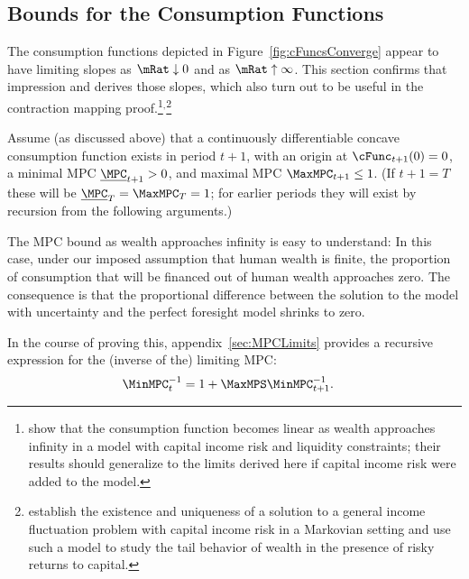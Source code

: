 \documentclass[BufferStockTheory]{subfiles}
\begin{document}
\hypertarget{Bounds-for-the-Consumption-Functions}{}
\subsection{Bounds for the Consumption Functions}

The consumption functions depicted in Figure~\ref{fig:cFuncsConverge} appear
to have limiting slopes as $\mRat \downarrow 0$ and as $\mRat \uparrow
\infty$.  This section confirms that impression and derives those
slopes, which also turn out to be useful in the contraction
mapping proof.\footnote{\cite{benhabibWealth} show that the consumption function
becomes linear as wealth approaches infinity in a model with capital income risk and liquidity
  constraints; their results should generalize to the limits derived here if capital income risk were added to the model.}$^{,}$\footnote{\cite{MaStachurskiToda2020JET} establish the existence and uniqueness of a solution to a general income fluctuation problem with capital income risk in a Markovian setting and use such a model to study the tail behavior of wealth in the presence of risky returns to capital.}

\newcommand{\NewMaxMinMPC}{\ushort{\MPC}}

Assume (as discussed above) that a continuously differentiable
concave consumption function exists in period $t+1$, with an origin at
$\cFunc_{t+1}(0)=0$, a minimal MPC $\NewMaxMinMPC_{t+1}>0$, and
maximal MPC $\MaxMPC_{t+1} \leq 1$.  (If $t+1 = T$ these will be
$\NewMaxMinMPC_{T}=\MaxMPC_{T}=1$; for earlier periods they will exist
by recursion from the following arguments.)

The MPC bound as wealth approaches infinity is easy to understand: In this case,
under our imposed assumption that human wealth is finite, the proportion of consumption
that will be financed out of human wealth approaches zero. The
consequence is that the proportional difference between the solution to the
model with uncertainty and the perfect foresight model shrinks to zero.

\hypertarget{MPCnvrsLower}{}
\hypertarget{WRICCond}{}
In the course of proving this, appendix~\ref{sec:MPCLimits}  provides a recursive expression for the (inverse of the) limiting MPC: 
\begin{align}
  \MinMPC_{t}^{-1}  & = 1+\MaxMPS \MinMPC_{t+1}^{-1} \label{eq:MinMPCInv}.
\end{align}
\end{document}
